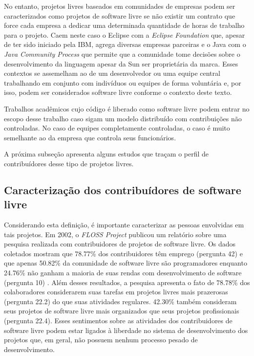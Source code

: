 No entanto, projetos livres baseados em comunidades de empresas podem
ser caracterizados como projetos de software livre se não existir um
contrato que force cada empresa a dedicar uma determinada quantidade
de horas de trabalho para o projeto. Caem neste caso o Eclipse com a
\emph{Eclipse Foundation} que, apesar de ter sido iniciado pela IBM,
agrega diversas empresas parceiras e o Java com o \emph{Java Community
  Process} que permite que a comunidade tome decisões sobre o
desenvolvimento da linguagem apesar da Sun ser proprietária da
marca. Esses contextos se assemelham ao de um desenvolvedor ou uma
equipe central trabalhando em conjunto com indivíduos ou equipes de
forma voluntária e, por isso, podem ser considerados software livre
conforme o contexto deste texto.

Trabalhos acadêmicos cujo código é liberado como software livre podem
entrar no escopo desse trabalho caso sigam um modelo distribuído com
contribuições não controladas. No caso de equipes completamente
controladas, o caso é muito semelhante ao da empresa que controla seus
funcionários.

A próxima subseção apresenta alguns estudos que traçam o perfil de
contribuídores desse tipo de projetos livres.

\subsection{Caracterização dos contribuídores de software livre}
\label{subsec:caracterizacao}

Considerando esta definição, é importante caracterizar as pessoas
envolvidas em tais projetos. Em 2002, o \emph{FLOSS Project}
\cite{FlossProject} publicou um relatório sobre uma pesquisa realizada
com contribuidores de projetos de software livre. Os dados coletados
mostram que 78.77\% dos contribuidores têm emprego (pergunta 42) e que
apenas 50.82\% da comunidade de software livre são programadores
enquanto 24.76\% não ganham a maioria de suas rendas com
desenvolvimento de software (pergunta 10) \cite{FlossStats}. Além
desses resultados, a pesquisa apresenta o fato de 78.78\% dos
colaboradores considerarem suas tarefas em projetos livres mais
prazerosas (pergunta 22.2) do que suas atividades regulares. 42.30\%
também consideram seus projetos de software livre mais organizados que
seus projetos profissionais (pergunta 22.4).  Esses sentimentos sobre
as atividades dos contribuidores de software livre podem estar ligados
à liberdade no sistema de desenvolvimento dos projetos que, em geral,
não possuem nenhum processo pesado de desenvolvimento.

